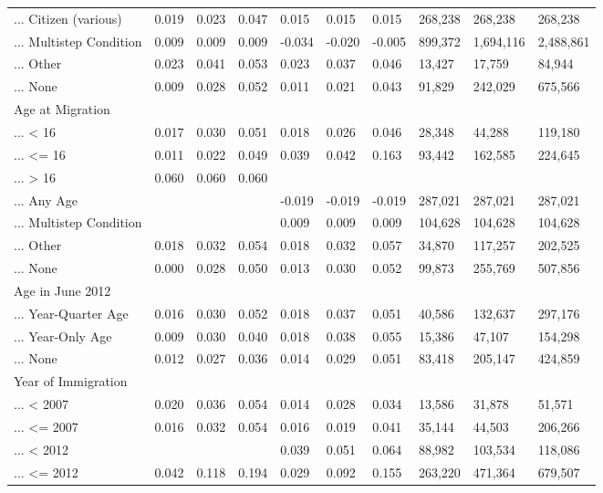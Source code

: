 \documentclass[
  letterpaper,
  DIV=11,
  numbers=noendperiod]{scrartcl}
\begin{document}
\begin{table}[!htbp]
{\begin{tabular}{llllllllll}
... Citizen (various) & 0.019 & 0.023 & 0.047 & 0.015 & 0.015 & 0.015 & 268,238 & 268,238 & 268,238 \\ 
... Multistep Condition & 0.009 & 0.009 & 0.009 & -0.034 & -0.020 & -0.005 & 899,372 & 1,694,116 & 2,488,861 \\ 
... Other & 0.023 & 0.041 & 0.053 & 0.023 & 0.037 & 0.046 & 13,427 & 17,759 & 84,944 \\ 
... None & 0.009 & 0.028 & 0.052 & 0.011 & 0.021 & 0.043 & 91,829 & 242,029 & 675,566 \\ 
Age at Migration &  &  &  &  &  &  &  &  &  \\ 
... < 16 & 0.017 & 0.030 & 0.051 & 0.018 & 0.026 & 0.046 & 28,348 & 44,288 & 119,180 \\ 
... <= 16 & 0.011 & 0.022 & 0.049 & 0.039 & 0.042 & 0.163 & 93,442 & 162,585 & 224,645 \\ 
... > 16 & 0.060 & 0.060 & 0.060 &  &  &  &  &  &  \\ 
... Any Age &  &  &  & -0.019 & -0.019 & -0.019 & 287,021 & 287,021 & 287,021 \\ 
... Multistep Condition &  &  &  & 0.009 & 0.009 & 0.009 & 104,628 & 104,628 & 104,628 \\ 
... Other & 0.018 & 0.032 & 0.054 & 0.018 & 0.032 & 0.057 & 34,870 & 117,257 & 202,525 \\ 
... None & 0.000 & 0.028 & 0.050 & 0.013 & 0.030 & 0.052 & 99,873 & 255,769 & 507,856 \\ 
Age in June 2012 &  &  &  &  &  &  &  &  &  \\ 
... Year-Quarter Age & 0.016 & 0.030 & 0.052 & 0.018 & 0.037 & 0.051 & 40,586 & 132,637 & 297,176 \\ 
... Year-Only Age & 0.009 & 0.030 & 0.040 & 0.018 & 0.038 & 0.055 & 15,386 & 47,107 & 154,298 \\ 
... None & 0.012 & 0.027 & 0.036 & 0.014 & 0.029 & 0.051 & 83,418 & 205,147 & 424,859 \\ 
Year of Immigration &  &  &  &  &  &  &  &  &  \\ 
... < 2007 & 0.020 & 0.036 & 0.054 & 0.014 & 0.028 & 0.034 & 13,586 & 31,878 & 51,571 \\ 
... <= 2007 & 0.016 & 0.032 & 0.054 & 0.016 & 0.019 & 0.041 & 35,144 & 44,503 & 206,266 \\ 
... < 2012 &  &  &  & 0.039 & 0.051 & 0.064 & 88,982 & 103,534 & 118,086 \\ 
... <= 2012 & 0.042 & 0.118 & 0.194 & 0.029 & 0.092 & 0.155 & 263,220 & 471,364 & 679,507 \\ 

\end{tabular}}
\end{table}
\end{document}

